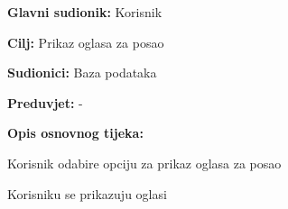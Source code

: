 				\noindent {}
				\begin{packed_item}
					
					\item \textbf{Glavni sudionik:} Korisnik
					\item  \textbf{Cilj:} Prikaz oglasa za posao
					\item  \textbf{Sudionici:} Baza podataka
					\item  \textbf{Preduvjet:} -
					\item  \textbf{Opis osnovnog tijeka:}
					
					\item[] \begin{packed_enum}
						
						\item Korisnik odabire opciju za prikaz oglasa za posao
						\item Korisniku se prikazuju oglasi
						
					\end{packed_enum}
					
				\end{packed_item}
					
